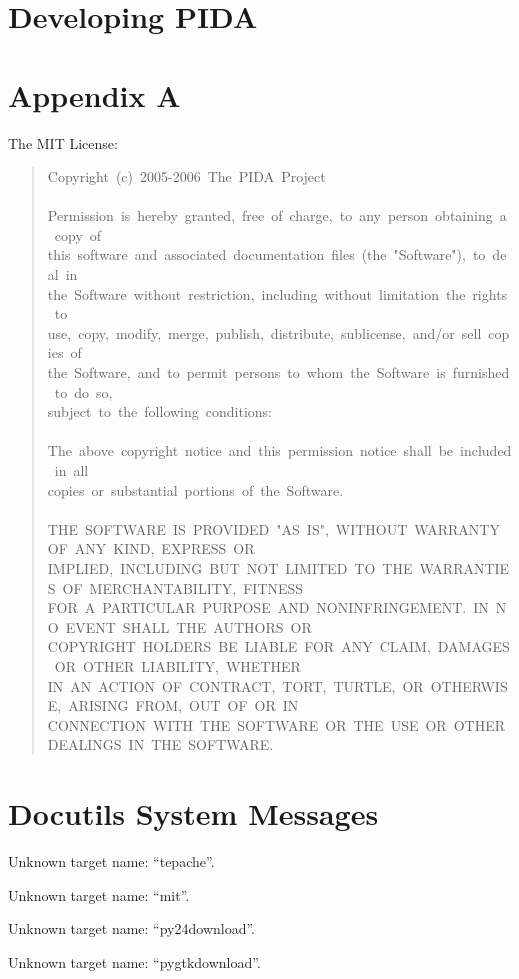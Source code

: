 \documentclass[10pt,a4paper,english]{article}
\begin{document}

\hypertarget{developing-pida}{}
\section*{Developing PIDA}



\hypertarget{appendix-a}{}
\section*{Appendix A}

The MIT License:
\begin{quote}{\ttfamily \raggedright \noindent
Copyright~(c)~2005-2006~The~PIDA~Project~\\
~\\
Permission~is~hereby~granted,~free~of~charge,~to~any~person~obtaining~a~copy~of~\\
this~software~and~associated~documentation~files~(the~"Software"),~to~deal~in~\\
the~Software~without~restriction,~including~without~limitation~the~rights~to~\\
use,~copy,~modify,~merge,~publish,~distribute,~sublicense,~and/or~sell~copies~of~\\
the~Software,~and~to~permit~persons~to~whom~the~Software~is~furnished~to~do~so,~\\
subject~to~the~following~conditions:~\\
~\\
The~above~copyright~notice~and~this~permission~notice~shall~be~included~in~all~\\
copies~or~substantial~portions~of~the~Software.~\\
~\\
THE~SOFTWARE~IS~PROVIDED~"AS~IS",~WITHOUT~WARRANTY~OF~ANY~KIND,~EXPRESS~OR~\\
IMPLIED,~INCLUDING~BUT~NOT~LIMITED~TO~THE~WARRANTIES~OF~MERCHANTABILITY,~FITNESS~\\
FOR~A~PARTICULAR~PURPOSE~AND~NONINFRINGEMENT.~IN~NO~EVENT~SHALL~THE~AUTHORS~OR~\\
COPYRIGHT~HOLDERS~BE~LIABLE~FOR~ANY~CLAIM,~DAMAGES~OR~OTHER~LIABILITY,~WHETHER~\\
IN~AN~ACTION~OF~CONTRACT,~TORT,~TURTLE,~OR~OTHERWISE,~ARISING~FROM,~OUT~OF~OR~IN~\\
CONNECTION~WITH~THE~SOFTWARE~OR~THE~USE~OR~OTHER~DEALINGS~IN~THE~SOFTWARE.
}\end{quote}



\section*{Docutils System Messages}

Unknown target name: ``tepache''.


Unknown target name: ``mit''.


Unknown target name: ``py24download''.


Unknown target name: ``pygtkdownload''.
\end{document}
